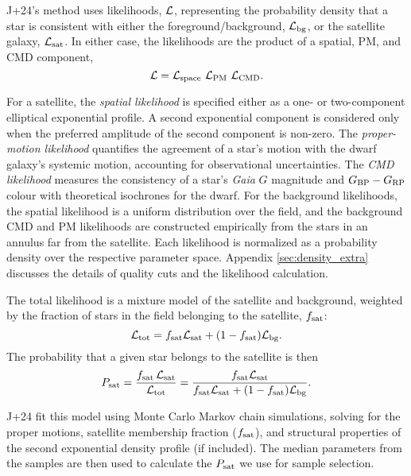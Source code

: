 J+24's method uses likelihoods, \({\cal L}\), representing the
probability density that a star is consistent with either the
foreground/background, \({\cal L}_{\rm bg}\), or the satellite galaxy,
\({\cal L}_{\rm sat}\). In either case, the likelihoods are the product
of a spatial, PM, and CMD component, \begin{equation}{
{\cal L} = {\cal L}_{\rm space}\ {\cal L}_{\rm PM}\ {\cal L}_{\rm CMD}.
}\end{equation}

For a satellite, the \emph{spatial likelihood} is specified either as a
one- or two-component elliptical exponential profile. A second
exponential component is considered only when the preferred amplitude of
the second component is non-zero. The \emph{proper-motion likelihood}
quantifies the agreement of a star's motion with the dwarf galaxy's
systemic motion, accounting for observational uncertainties. The
\emph{CMD likelihood} measures the consistency of a star's \emph{Gaia}
\(G\) magnitude and \(G_{\rm BP}- G_{\rm RP}\) colour with theoretical
isochrones for the dwarf. For the background likelihoods, the spatial
likelihood is a uniform distribution over the field, and the background
CMD and PM likelihoods are constructed empirically from the stars in an
annulus far from the satellite. Each likelihood is normalized as a
probability density over the respective parameter space. Appendix
\ref{sec:density_extra} discusses the details of quality cuts and the
likelihood calculation.

The total likelihood is a mixture model of the satellite and background,
weighted by the fraction of stars in the field belonging to the
satellite, \(f_{\rm sat}\): \begin{equation}{
{\cal L}_{\rm tot} = f_{\rm sat}{\cal L}_{\rm sat} + (1-f_{\rm sat}){\cal L}_{\rm bg}.
}\end{equation} The probability that a given star belongs to the
satellite is then \begin{equation}{
P_{\rm sat} = 
\frac{f_{\rm sat}\,{\cal L}_{\rm sat}}{{\cal L}_{\rm tot}}
= \frac{f_{\rm sat}{\cal L}_{\rm sat}}{f_{\rm sat}{\cal L}_{\rm sat} + (1-f_{\rm sat}){\cal L}_{\rm bg}}.
}\end{equation}

J+24 fit this model using Monte Carlo Markov chain simulations, solving
for the proper motions, satellite membership fraction (\(f_{\rm sat}\)),
and structural properties of the second exponential density profile (if
included). The median parameters from the samples are then used to
calculate the \(P_{\rm sat}\) we use for sample selection.

